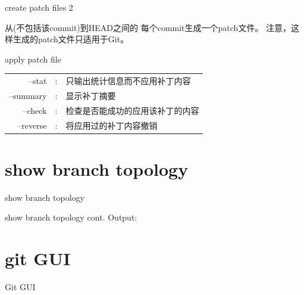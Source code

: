 ﻿\documentclass{beamer}
\begin{document}
\begin{frame}{create patch files 2}
\vspace{1em}
\begin{center}
\begin{minipage}{0.7\textwidth}
  \ttfamily
  从(不包括该commit)到HEAD之间的
  每个commit生成一个patch文件。
  注意，这样生成的patch文件只适用于Git。
\end{minipage}
\end{center}
\end{frame}

\begin{frame}{apply patch file}
\begin{center}
{\ttfamily
  \begin{tabular}{rcl}
    --stat&:&只输出统计信息而不应用补丁内容\\
    --summary&:&显示补丁摘要\\
    --check&:&检查是否能成功的应用该补丁的内容\\
    --reverse&:&将应用过的补丁内容撤销\\
  \end{tabular}
}
\end{center}
\end{frame}


\section[show branch topology]{show branch topology}
\begin{frame}{show branch topology}
\end{frame}

\begin{frame}{show branch topology cont.}
  \textcolor{blue!50}{\ttfamily Output:}
  
\end{frame}

\section[git GUI]{git GUI}
\begin{frame}{Git GUI}
\end{frame}
\end{document}
